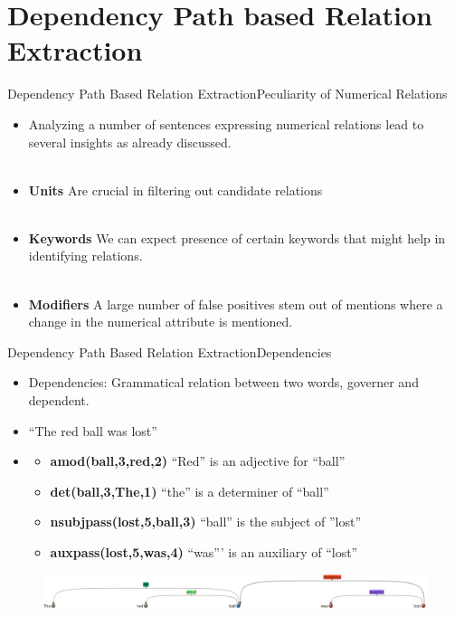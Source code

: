 \documentclass{beamer}
\begin{document}
\section{Dependency Path based Relation Extraction}
\begin{frame}{Dependency Path Based Relation Extraction}{Peculiarity of Numerical Relations}
\begin{itemize}
 \item Analyzing a number of sentences expressing numerical relations lead to several insights as already discussed. \\~\\
 \item \textbf{Units} Are crucial in filtering out candidate relations \\~\\
 \item \textbf{Keywords} We can expect presence of certain keywords that might help in identifying relations. \\~\\
 \item \textbf{Modifiers} A large number of false positives stem out of mentions where a change in the numerical attribute is mentioned.
\end{itemize}

\end{frame}

\begin{frame}{Dependency Path Based Relation Extraction}{Dependencies}
\begin{itemize}
 \item Dependencies: Grammatical relation between two words, governer and dependent. \\
 \item ``The red ball was lost'' \\
\item \begin{itemize}
\item \textbf{amod(ball,3,red,2)} ``Red'' is an adjective for ``ball''
\item \textbf{det(ball,3,The,1)}  ``the'' is a determiner of ``ball''
\item \textbf{nsubjpass(lost,5,ball,3)}	``ball'' is the subject of ''lost''
\item \textbf{auxpass(lost,5,was,4)}	``was''' is an auxiliary of ``lost''
\end {itemize}
\end{itemize}
\begin{figure}[h]
 \centering
 \includegraphics[bb=0 0 1281 118,scale=0.25]{./imgs/dep.png}
\end{figure}

\end{frame}
\end{document}

